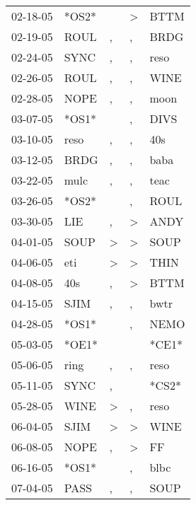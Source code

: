 \begin{supertabular}{lllll}
 02-18-05 &  *OS2* &                  &     \textgreater &   BTTM \\
 02-19-05 &   ROUL &                , &                , &   BRDG \\
 02-24-05 &   SYNC &                , &                , &   reso \\
 02-26-05 &   ROUL &                , &                , &   WINE \\
 02-28-05 &   NOPE &                , &                , &   moon \\
 03-07-05 &  *OS1* &                  &                , &   DIVS \\
 03-10-05 &   reso &                , &                , &    40s \\
 03-12-05 &   BRDG &                , &                , &   baba \\
 03-22-05 &   mulc &                , &                , &   teac \\
 03-26-05 &  *OS2* &                  &                , &   ROUL \\
 03-30-05 &    LIE &                , &     \textgreater &   ANDY \\
 04-01-05 &   SOUP &     \textgreater &     \textgreater &   SOUP \\
 04-06-05 &    eti &     \textgreater &     \textgreater &   THIN \\
 04-08-05 &    40s &                , &     \textgreater &   BTTM \\
 04-15-05 &   SJIM &                , &                , &   bwtr \\
 04-28-05 &  *OS1* &                  &                , &   NEMO \\
 05-03-05 &  *OE1* &                  &                  &  *CE1* \\
 05-06-05 &   ring &                , &                , &   reso \\
 05-11-05 &   SYNC &                , &                  &  *CS2* \\
 05-28-05 &   WINE &     \textgreater &                , &   reso \\
 06-04-05 &   SJIM &     \textgreater &     \textgreater &   WINE \\
 06-08-05 &   NOPE &                , &     \textgreater &     FF \\
 06-16-05 &  *OS1* &                  &                , &   blbc \\
 07-04-05 &   PASS &                , &                , &   SOUP \\

\end{supertabular}
